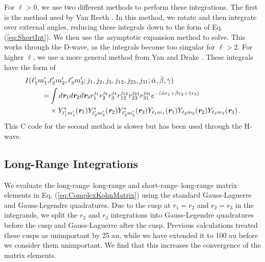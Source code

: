 \documentclass[preprint,showpacs,preprintnumbers,amsmath,amssymb]{revtex4}
\begin{document}
For $\ell > 0$, we use two different methods to perform these integrations. The first is the method used by Van Reeth \cite{VanReethThesis}. In this method, we rotate and then integrate over external angles, reducing these integrals down to the form of Eq. (\ref{eq:ShortInt}). We then use the asymptotic expansion method \cite{Drake1995} to solve. This works through the D-wave, as the integrals become too singular for $\ell > 2$. For higher $\ell$, we use a more general method from Yan and Drake \cite{Yan1997}. These integrals have the form of
\begin{align}
\label{eq:ShortIntGen}
\nonumber I(\ell_1^\prime m_1^\prime, & \ell_2^\prime m_2^\prime, \ell_3^\prime m_3^\prime; j_1,j_2,j_3,j_{12},j_{23},j_{31}; \bar{\alpha}, \bar{\beta}, \bar{\gamma}) \\
\nonumber = & \int
d \textit{\textbf{r}}_1 d \textit{\textbf{r}}_2 d \textit{\textbf{r}}_3
r_1^{j_1} r_2^{j_2} r_3^{j_3} r_{12}^{j_{12}}
r_{23}^{j_{23}} r_{31}^{j_{31}}
e^{-(\bar{\alpha} r_1 + \bar{\beta} r_2 + \bar{\gamma} r_3)} \\
& \times Y_{\ell_1^\prime m_1^\prime}^* (\textit{\textbf{r}}_1) Y_{\ell_2^\prime m_2^\prime}^* (\textit{\textbf{r}}_2) Y_{\ell_3^\prime m_3^\prime}^* (\textit{\textbf{r}}_3)
Y_{\ell_1 m_1} (\textit{\textbf{r}}_1) Y_{\ell_2 m_2} (\textit{\textbf{r}}_2) Y_{\ell_3 m_3} (\textit{\textbf{r}}_3)\, .
\end{align}
This C code for the second method is slower but has been used through the H-wave.

\subsection{Long-Range Integrations}
\label{sec:LongInt}
We evaluate the long-range--long-range and short-range--long-range matrix elements in Eq. (\ref{eq:ComplexKohnMatrix}) using the standard Gauss-Laguerre and Gauss-Legendre quadratures. Due to the cusp at $r_1 = r_2$ and $r_2 = r_3$ in the integrands, we split the $r_2$ and $r_3$ integrations into Gauss-Legendre quadratures before the cusp and Gauss-Laguerre after the cusp. Previous calculations \cite{VanReeth2003,VanReeth2004} treated these cusps as unimportant by 25 au, while we have extended it to 100 au before we consider them unimportant. We find that this increases the convergence of the matrix elements.
\end{document}
